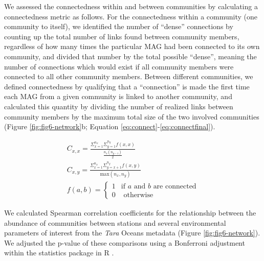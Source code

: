 \documentclass[12pt]{article}
\numberwithin{equation}{section}
\begin{document}
We assessed the connectedness within and between communities by calculating a connectedness metric as follows. For the connectedness within a community (one community to itself), we identified the number of ``dense'' connections by counting up the total number of links found between community members, regardless of how many times the particular MAG had been connected to its own community, and divided that number by the total possible ``dense'', meaning the number of connections which would exist if all community members were connected to all other community members. Between different communities, we defined connectedness by qualifying that a ``connection'' is made the first time each MAG from a given community is linked to another community, and calculated this quantity by dividing the number of realized links between community members by the maximum total size of the two involved communities (Figure \ref{fig:fig6-network}b; Equation \ref{eq:connect}-\ref{eq:connectfinal}). 

\begin{gather}\label{eq:connect}
    C_{x,x} = \frac{\Sigma_{x=1}^{n_x} \Sigma_{y=1}^{n_y} f(x,x)}{\frac{n_x (n_{y-1})}{2}} \\
    C_{x,y} = \frac{\Sigma_{x=1}^{n_x} \Sigma_{y=x+1}^{n_y} f(x,y)}{\textrm{max}(n_x,n_y)} \\
    f(a,b) = \begin{cases}
       1 & \textrm{if } a \textrm{ and } b \textrm{ are connected} \\
       0 & \textrm{ otherwise} \label{eq:connectfinal}
    \end{cases} 
\end{gather}

We calculated Spearman correlation coefficients for the relationship between the abundance of communities between stations and several environmental parameters of interest from the \textit{Tara} Oceans metadata \citep{taraoceansconsortium2014ross} (Figure \ref{fig:fig6-network}). We adjusted the p-value of these comparisons using a Bonferroni adjustment within the statistics package in R \citep{teamr}. 





\end{document}
